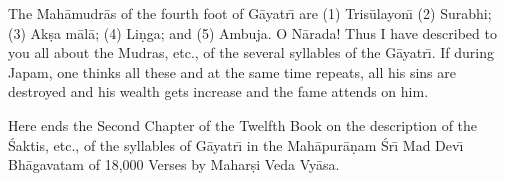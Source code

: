 The Mah\=amudr\=as of the fourth foot of G\=ayatr\={\i} are (1) Tris\=ulayon\={\i} (2) Surabhi; (3) Ak\d{s}a m\=al\=a; (4) Li\d{n}ga; and (5) Ambuja. O N\=arada! Thus I have described to you all about the Mudras, etc., of the several syllables of the G\=ayatr\={\i}. If during Japam, one thinks all these and at the same time repeats, all his sins are destroyed and his wealth gets increase and the fame attends on him.

Here ends the Second Chapter of the Twelfth Book on the description of the \'Saktis, etc., of the syllables of G\=ayatr\={\i} in the Mah\=apur\=a\d{n}am \'Sr\={\i} Mad Dev\={\i} Bh\=agavatam of 18,000 Verses by Mahar\d{s}i Veda Vy\=asa.



